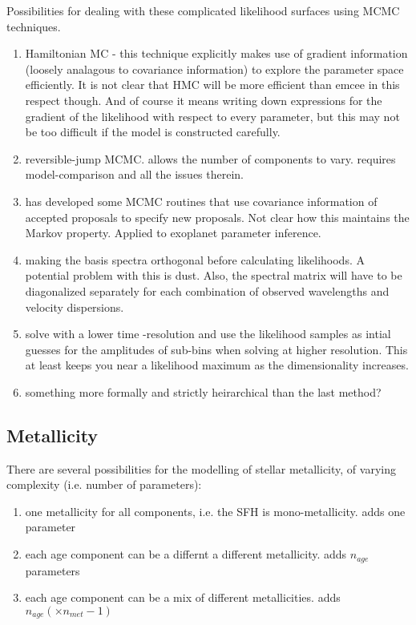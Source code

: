 Possibilities for dealing with these complicated likelihood surfaces using MCMC techniques.

\begin{enumerate}

\item Hamiltonian MC - this technique explicitly makes use of gradient information (loosely analagous to covariance information) to explore the parameter space efficiently.  It is not clear that HMC will be more efficient than emcee in this respect though.  And of course it means writing down expressions for the gradient of the likelihood with respect to every parameter, but this may not be too difficult if the model is constructed carefully.

\item reversible-jump MCMC.  allows the number of components to vary.  requires model-comparison and all the issues therein.  

\item \citet{gregory11} has developed some MCMC routines that use covariance information of accepted proposals to specify new proposals.  Not clear how this maintains the Markov property.  Applied to exoplanet parameter inference.

\item making the basis spectra orthogonal before calculating likelihoods.  A potential problem with this is dust.  Also, the spectral matrix will have to be diagonalized separately for each combination of observed wavelengths and velocity dispersions.

\item solve with a lower time -resolution and use the likelihood samples as intial guesses for the amplitudes of sub-bins when solving at higher resolution.  This at least keeps you near a likelihood maximum as the dimensionality increases.

\item something more formally and strictly heirarchical than the last method?

\end{enumerate}

\subsection{Metallicity}
There are several possibilities for the modelling of stellar metallicity, of varying complexity (i.e. number of parameters):
\begin{enumerate}

\item one metallicity for all components, i.e. the SFH is mono-metallicity.  adds one parameter

\item each age component can be a differnt a different metallicity.  adds $n_{age}$ parameters

\item each age component can be a mix of different metallicities.  adds $n_{age} (\times n_{met} -1)$

\end{enumerate}

